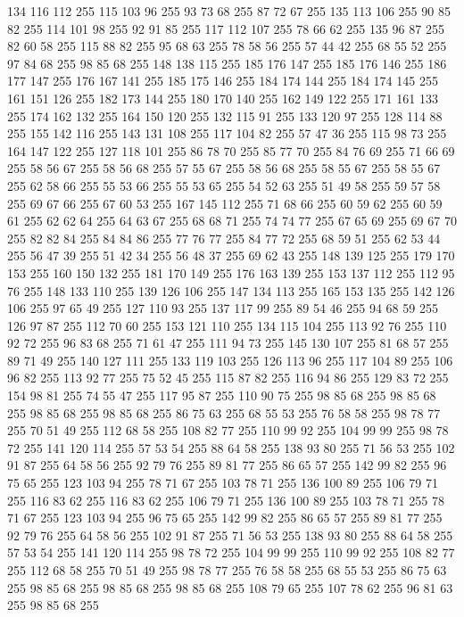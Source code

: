 134 116 112 255 115 103 96 255 93 73 68 255 87 72 67 255 135 113 106 255 90 85 82 255 114 101 98 255 92 91 85 255 117 112 107 255 78 66 62 255 135 96 87 255 82 60 58 255 115 88 82 255 95 68 63 255 78 58 56 255 57 44 42 255 68 55 52 255 97 84 68 255 98 85 68 255 148 138 115 255 185 176 147 255 185 176 146 255 186 177 147 255 176 167 141 255 185 175 146 255 184 174 144 255 184 174 145 255 161 151 126 255 182 173 144 255 180 170 140 255 162 149 122 255 171 161 133 255 174 162 132 255 164 150 120 255 132 115 91 255 133 120 97 255 128 114 88 255 155 142 116 255 143 131 108 255 117 104 82 255 57 47 36 255 115 98 73 255 164 147 122 255 127 118 101 255 86 78 70 255 85 77 70 255 84 76 69 255 71 66 69 255 58 56 67 255 58 56 68 255 57 55 67 255 58 56 68 255 58 55 67 255 58 55 67 255 62 58 66 255 55 53 66 255 55 53 65 255 54 52 63 255 51 49 58 255 59 57 58 255 69 67 66 255 67 60 53 255 167 145 112 255 71 68 66 255
60 59 62 255 60 59 61 255 62 62 64 255 64 63 67 255 68 68 71 255 74 74 77 255 67 65 69 255 69 67 70 255 82 82 84 255 84 84 86 255 77 76 77 255 84 77 72 255 68 59 51 255 62 53 44 255 56 47 39 255 51 42 34 255 56 48 37 255 69 62 43 255 148 139 125 255 179 170 153 255 160 150 132 255 181 170 149 255 176 163 139 255 153 137 112 255 112 95 76 255 148 133 110 255 139 126 106 255 147 134 113 255 165 153 135 255 142 126 106 255 97 65 49 255 127 110 93 255 137 117 99 255 89 54 46 255 94 68 59 255 126 97 87 255 112 70 60 255 153 121 110 255 134 115 104 255 113 92 76 255 110 92 72 255 96 83 68 255 71 61 47 255 111 94 73 255 145 130 107 255 81 68 57 255 89 71 49 255 140 127 111 255 133 119 103 255 126 113 96 255 117 104 89 255 106 96 82 255 113 92 77 255 75 52 45 255 115 87 82 255 116 94 86 255 129 83 72 255 154 98 81 255 74 55 47 255 117 95 87 255 110 90 75 255 98 85 68 255 98 85 68 255 98 85 68 255
98 85 68 255 86 75 63 255 68 55 53 255 76 58 58 255 98 78 77 255 70 51 49 255 112 68 58 255 108 82 77 255 110 99 92 255 104 99 99 255 98 78 72 255 141 120 114 255 57 53 54 255 88 64 58 255 138 93 80 255 71 56 53 255 102 91 87 255 64 58 56 255 92 79 76 255 89 81 77 255 86 65 57 255 142 99 82 255 96 75 65 255 123 103 94 255 78 71 67 255 103 78 71 255 136 100 89 255 106 79 71 255 116 83 62 255 116 83 62 255 106 79 71 255 136 100 89 255 103 78 71 255 78 71 67 255 123 103 94 255 96 75 65 255 142 99 82 255 86 65 57 255 89 81 77 255 92 79 76 255 64 58 56 255 102 91 87 255 71 56 53 255 138 93 80 255 88 64 58 255 57 53 54 255 141 120 114 255 98 78 72 255 104 99 99 255 110 99 92 255 108 82 77 255 112 68 58 255 70 51 49 255 98 78 77 255 76 58 58 255 68 55 53 255 86 75 63 255 98 85 68 255 98 85 68 255 98 85 68 255 108 79 65 255 107 78 62 255 96 81 63 255 98 85 68 255

